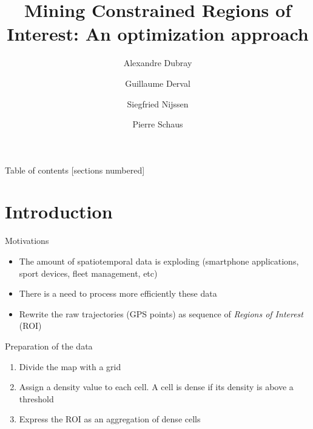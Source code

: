 \documentclass[10pt]{beamer}
\title{Mining Constrained Regions of Interest: An optimization approach}
\date{}
\author{Alexandre Dubray \and Guillaume Derval \and Siegfried Nijssen \and Pierre Schaus}
\institute{}
\begin{document}
\maketitle

\begin{frame}{Table of contents}
  [sections numbered]
  \tableofcontents%
\end{frame}

\section{Introduction}

\begin{frame}{Motivations}
\begin{itemize}
    \item The amount of spatiotemporal data is exploding (smartphone applications, sport devices, fleet management, etc)
    \item There is a need to process more efficiently these data
    \item Rewrite the raw trajectories (GPS points) as sequence of \emph{Regions of Interest} (ROI)
\end{itemize}
\end{frame}

\begin{frame}{Preparation of the data}
    \begin{enumerate}
        \item Divide the map with a grid
        \item Assign a density value to each cell. A cell is dense if its density is above a threshold
        \item Express the ROI as an aggregation of dense cells
    \end{enumerate}
\end{frame}
\end{document}
